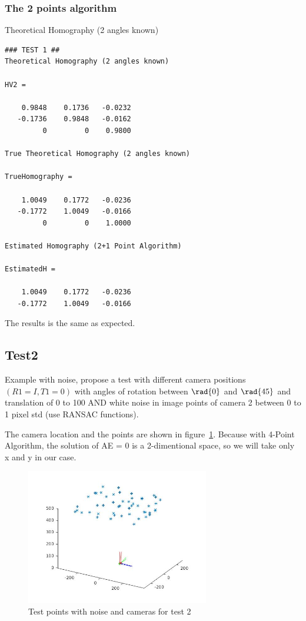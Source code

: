 \documentclass[a4paper,12pt]{article}
\begin{document}
\subsubsection{The 2 points algorithm}

Theoretical Homography (2 angles known)

\begin{verbatim}
### TEST 1 ##
Theoretical Homography (2 angles known)

HV2 =

    0.9848    0.1736   -0.0232
   -0.1736    0.9848   -0.0162
         0         0    0.9800

True Theoretical Homography (2 angles known)

TrueHomography =

    1.0049    0.1772   -0.0236
   -0.1772    1.0049   -0.0166
         0         0    1.0000

Estimated Homography (2+1 Point Algorithm)

EstimatedH =

    1.0049    0.1772   -0.0236
   -0.1772    1.0049   -0.0166
\end{verbatim}
The results is the same as expected.

\subsection{Test2}
Example with noise, propose a test with different camera positions $(R1 =
I, T1 = 0)$ with angles of rotation between $\rad{0}$ and $\rad{45}$ and translation of 0 to
100 AND white noise in image points of camera 2 between 0 to 1 pixel std (use
RANSAC functions).

The camera location and the points are shown in figure~\ref{fig:points2}. Because with 4-Point Algorithm, the solution of AE = 0 is a
 2-dimentional space, so we will take only x and y in our  case.

\begin{figure}[tb]
         \centering
         \includegraphics[width=8cm]{Images/points3D-test2.jpg}
         \caption{Test points with noise  and cameras for test 2}
 	\label{fig:points2}
\end{figure}
\end{document}
